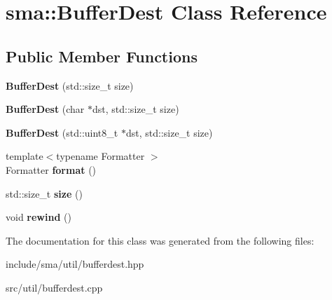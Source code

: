 \hypertarget{classsma_1_1BufferDest}{\section{sma\-:\-:Buffer\-Dest Class Reference}
\label{classsma_1_1BufferDest}
}
\subsection*{Public Member Functions}
\begin{DoxyCompactItemize}
\item 
\hypertarget{classsma_1_1BufferDest_a0069ae2c6751ed8db3c275bcf625c0c2}{{\bfseries Buffer\-Dest} (std\-::size\-\_\-t size)}\label{classsma_1_1BufferDest_a0069ae2c6751ed8db3c275bcf625c0c2}

\item 
\hypertarget{classsma_1_1BufferDest_a41d3943720ab0e4233bb4747f46cfce7}{{\bfseries Buffer\-Dest} (char $\ast$dst, std\-::size\-\_\-t size)}\label{classsma_1_1BufferDest_a41d3943720ab0e4233bb4747f46cfce7}

\item 
\hypertarget{classsma_1_1BufferDest_acd931cafb3dd522826833e117db1086e}{{\bfseries Buffer\-Dest} (std\-::uint8\-\_\-t $\ast$dst, std\-::size\-\_\-t size)}\label{classsma_1_1BufferDest_acd931cafb3dd522826833e117db1086e}

\item 
\hypertarget{classsma_1_1BufferDest_a9d4ba8e11e57a90ea8bbcdb083c6f4d7}{{\footnotesize template$<$typename Formatter $>$ }\\Formatter {\bfseries format} ()}\label{classsma_1_1BufferDest_a9d4ba8e11e57a90ea8bbcdb083c6f4d7}

\item 
\hypertarget{classsma_1_1BufferDest_a99ee3b1da310fb5776aabef9f9b3439f}{std\-::size\-\_\-t {\bfseries size} ()}\label{classsma_1_1BufferDest_a99ee3b1da310fb5776aabef9f9b3439f}

\item 
\hypertarget{classsma_1_1BufferDest_ab1b010f817d8df6f3b3eecc69b36b9e5}{void {\bfseries rewind} ()}\label{classsma_1_1BufferDest_ab1b010f817d8df6f3b3eecc69b36b9e5}

\end{DoxyCompactItemize}


The documentation for this class was generated from the following files\-:\begin{DoxyCompactItemize}
\item 
include/sma/util/bufferdest.\-hpp\item 
src/util/bufferdest.\-cpp\end{DoxyCompactItemize}
